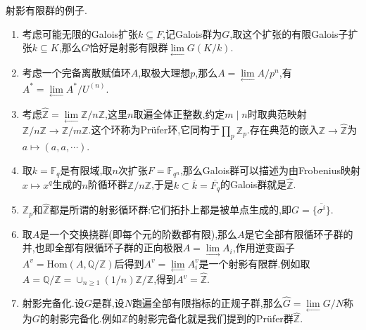 射影有限群的例子.
\begin{enumerate}
	\item 考虑可能无限的Galois扩张$k\subseteq F$,记Galois群为$G$,取这个扩张的有限Galois子扩张$k\subseteq K$,那么$G$恰好是射影有限群$\lim\limits_{\leftarrow}G(K/k)$.
	\item 考虑一个完备离散赋值环$A$,取极大理想$p$,那么$A=\lim\limits_{\leftarrow}A/p^n$,有$A^*=\lim\limits_{\leftarrow}A^*/U^{(n)}$.
	\item 考虑$\widehat{\mathbb{Z}}=\lim\limits_{\leftarrow}\mathbb{Z}/n\mathbb{Z}$,这里$n$取遍全体正整数,约定$m\mid n$时取典范映射$\mathbb{Z}/n\mathbb{Z}\to\mathbb{Z}/m\mathbb{Z}$.这个环称为Pr\"ufer环,它同构于$\prod_p\mathbb{Z}_p$.存在典范的嵌入$\mathbb{Z}\to\widehat{\mathbb{Z}}$为$a\mapsto(a,a,\cdots)$.
	\item 取$k=\mathbb{F}_q$是有限域,取$n$次扩张$F=\mathbb{F}_{q^n}$,那么Galois群可以描述为由Frobenius映射$x\mapsto x^q$生成的$n$阶循环群$\mathbb{Z}/n\mathbb{Z}$,于是$k\subset\overline{k}=\overline{F_q}$的Galois群就是$\widehat{\mathbb{Z}}$.
	\item $\mathbb{Z}_p$和$\widehat{\mathbb{Z}}$都是所谓的射影循环群:它们拓扑上都是被单点生成的,即$G=\overline{\{\sigma^i\}}$.
	\item 取$A$是一个交换挠群(即每个元的阶数都有限),那么$A$是它全部有限循环子群的并,也即全部有限循环子群的正向极限$A=\lim\limits_{\rightarrow}A_i$,作用逆变函子$A^v=\mathrm{Hom}(A,\mathbb{Q}/\mathbb{Z})$后得到$A^v=\lim\limits_{\leftarrow}A_i^v$是一个射影有限群.例如取$A=\mathbb{Q}/\mathbb{Z}=\cup_{n\ge1}(1/n)\mathbb{Z}/\mathbb{Z}$,得到$A^v=\widehat{\mathbb{Z}}$.
	\item 射影完备化.设$G$是群,设$N$跑遍全部有限指标的正规子群,那么$\widehat{G}=\lim\limits_{\leftarrow}G/N$称为$G$的射影完备化.例如$\mathbb{Z}$的射影完备化就是我们提到的Pr\"ufer群$\widehat{\mathbb{Z}}$.
\end{enumerate}

